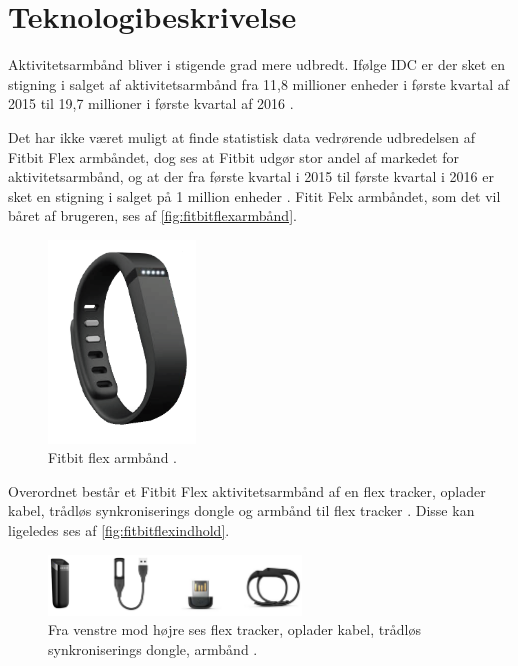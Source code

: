 
\section{Teknologibeskrivelse} \label{sec:teknologibeskrivelse}
Aktivitetsarmbånd bliver i stigende grad mere udbredt. Ifølge IDC er der sket en stigning i salget af aktivitetsarmbånd fra 11,8 millioner enheder i første kvartal af 2015 til 19,7 millioner i første kvartal af 2016 \citep{IDC2016}.

Det har ikke været muligt at finde statistisk data vedrørende udbredelsen af Fitbit Flex armbåndet, dog ses at Fitbit udgør stor andel af markedet for aktivitetsarmbånd, og at der fra første kvartal i 2015 til første kvartal i 2016 er sket en stigning i salget på 1 million enheder \citep{IDC2016}.  
Fitit Felx armbåndet, som det vil båret af brugeren, ses af \autoref{fig:fitbitflexarmbånd}. 

\begin{figure}[H]
	\centering
	\includegraphics[width=0.35\textwidth]{figures/fitbitflex}
	\caption{Fitbit flex armbånd \citep{fitbitflex}.}
	\label{fig:fitbitflexarmbånd}
\end{figure}

Overordnet består et Fitbit Flex aktivitetsarmbånd af en flex tracker, oplader kabel, trådløs synkroniserings dongle og armbånd til flex tracker \citep{fitbitflex}. Disse kan ligeledes ses af \autoref{fig:fitbitflexindhold}. 

\begin{figure}[H]
	\centering
	\includegraphics[width=0.6\textwidth]{figures/fitbitflexindhold}
	\caption{Fra venstre mod højre ses flex tracker, oplader kabel, trådløs synkroniserings dongle, armbånd \citep{fitbitflex}.}
	\label{fig:fitbitflexindhold}
\end{figure}

